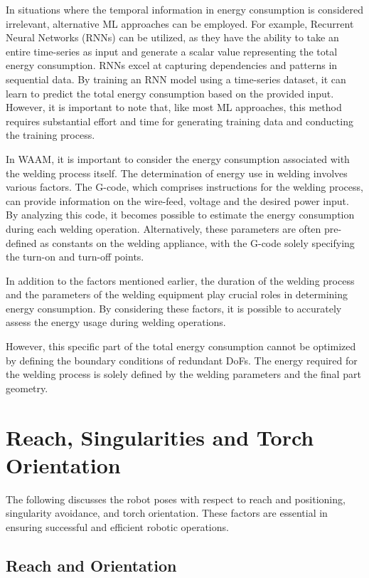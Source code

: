 In situations where the temporal information in energy consumption is considered irrelevant, alternative ML approaches can be employed. For example, Recurrent Neural Networks (RNNs) can be utilized, as they have the ability to take an entire time-series as input and generate a scalar value representing the total energy consumption. RNNs excel at capturing dependencies and patterns in sequential data. By training an RNN model using a time-series dataset, it can learn to predict the total energy consumption based on the provided input. However, it is important to note that, like most ML approaches, this method requires substantial effort and time for generating training data and conducting the training process.

In WAAM, it is important to consider the energy consumption associated with the welding process itself. The determination of energy use in welding involves various factors. The G-code, which comprises instructions for the welding process, can provide information on the wire-feed, voltage and the desired power input. By analyzing this code, it becomes possible to estimate the energy consumption during each welding operation. Alternatively, these parameters are often pre-defined as constants on the welding appliance, with the G-code solely specifying the turn-on and turn-off points.

In addition to the factors mentioned earlier, the duration of the welding process and the parameters of the welding equipment play crucial roles in determining energy consumption. By considering these factors, it is possible to accurately assess the energy usage during welding operations.

However, this specific part of the total energy consumption cannot be optimized by defining the boundary conditions of redundant DoFs. The energy required for the welding process is solely defined by the welding parameters and the final part geometry.


\section{Reach, Singularities and Torch Orientation}
The following discusses the robot poses with respect to reach and positioning, singularity avoidance, and torch orientation. These factors are essential in ensuring successful and efficient robotic operations.

\subsection{Reach and Orientation}\label{RO}

